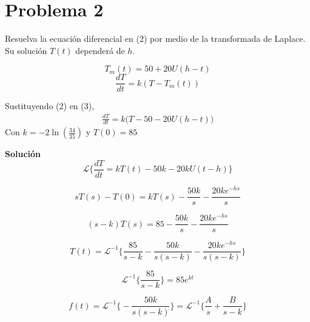\section*{Problema 2}
Resuelva la ecuación diferencial en (2) por medio de la transformada de Laplace. 
Su solución $T(t)$ dependerá de $h$.

\begin{equation}
    T_m(t) = 50 + 20 U(h - t)
\end{equation}
\begin{equation}
    \frac{dT}{dt} = k(T - T_m(t))
\end{equation}

\begin{center}

Sustituyendo (2) en (3),\\
\begin{align*}
    \frac{dT}{dt} = k\bigl(T - 50 - 20U(h - t)\bigr) 
\end{align*}
Con $k = -2\ln{\left(\frac{34}{35}\right)}$ y $T(0) = 85$\\ 
\vspace{12pt}


\textbf{Solución}\\
\begin{equation*}
    \mathscr{L}\biggl\{\frac{dT}{dt} = kT(t)- 50k - 20kU(t-h)\biggr\}
\end{equation*}

\begin{equation*}
    sT(s) - T(0) = kT(s) - \frac{50k}{s} - \frac{20ke^{-hs}}{s}
\end{equation*}

\begin{equation*}
    (s - k)T(s) = 85 - \frac{50k}{s} - \frac{20ke^{-hs}}{s}
\end{equation*}

\begin{equation*}
    T(t) = \mathscr{L}^{-1} \biggl\{\frac{85}{s-k} - \frac{50k}{s(s-k)} - \frac{20ke^{-hs}}{s(s-k)}\biggr\}
\end{equation*}

\begin{equation*}
    \mathscr{L}^{-1} \biggl\{ \frac{85}{s-k} \biggr\} = 85e^{kt}
\end{equation*} 

\begin{equation*}
    f(t) = \mathscr{L}^{-1} \biggl\{ -\frac{50k}{s(s-k)} \biggr\} = \mathscr{L}^{-1} \biggl\{ \frac{A}{s} + \frac{B}{s-k} \biggr\}
\end{equation*}


\end{center}

